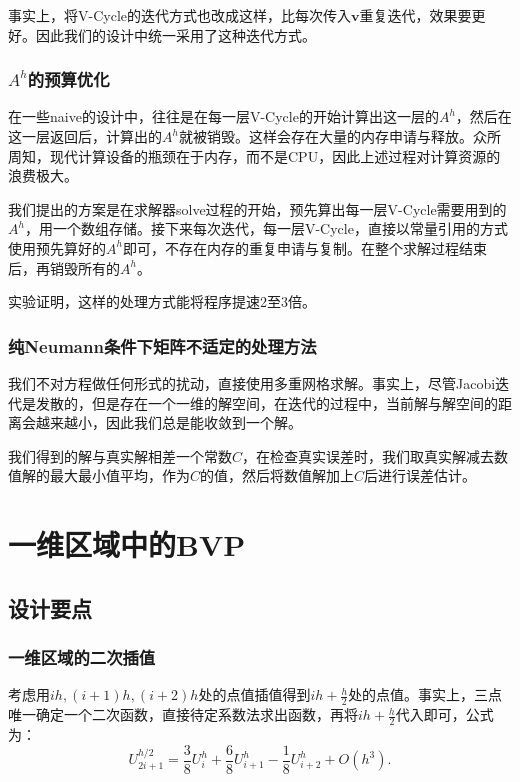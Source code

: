 \documentclass[lang=cn,10pt]{elegantbook}
\begin{document}
事实上，将V-Cycle的迭代方式也改成这样，比每次传入$\mathbf{v}$重复迭代，效果要更好。因此我们的设计中统一采用了这种迭代方式。

\subsection{$A^h$的预算优化}

在一些naive的设计中，往往是在每一层V-Cycle的开始计算出这一层的$A^h$，然后在这一层返回后，计算出的$A^h$就被销毁。这样会存在大量的内存申请与释放。众所周知，现代计算设备的瓶颈在于内存，而不是CPU，因此上述过程对计算资源的浪费极大。

我们提出的方案是在求解器solve过程的开始，预先算出每一层V-Cycle需要用到的$A^h$，用一个数组存储。接下来每次迭代，每一层V-Cycle，直接以常量引用的方式使用预先算好的$A^h$即可，不存在内存的重复申请与复制。在整个求解过程结束后，再销毁所有的$A^h$。

实验证明，这样的处理方式能将程序提速2至3倍。

\subsection{纯Neumann条件下矩阵不适定的处理方法}

我们不对方程做任何形式的扰动，直接使用多重网格求解。事实上，尽管Jacobi迭代是发散的，但是存在一个一维的解空间，在迭代的过程中，当前解与解空间的距离会越来越小，因此我们总是能收敛到一个解。

我们得到的解与真实解相差一个常数$C$，在检查真实误差时，我们取真实解减去数值解的最大最小值平均，作为$C$的值，然后将数值解加上$C$后进行误差估计。

\newpage

\chapter{一维区域中的BVP}

\section{设计要点}

\subsection{一维区域的二次插值}

考虑用$ih,(i+1)h,(i+2)h$处的点值插值得到$ih+\frac{h}{2}$处的点值。事实上，三点唯一确定一个二次函数，直接待定系数法求出函数，再将$ih+\frac{h}{2}$代入即可，公式为：
\begin{equation}
  U^{h/2}_{2i+1} = \frac{3}{8}U^h_{i} + \frac{6}{8}U^h_{i+1} - \frac{1}{8}U^h_{i+2} + O(h^3).
\end{equation}
\end{document}
